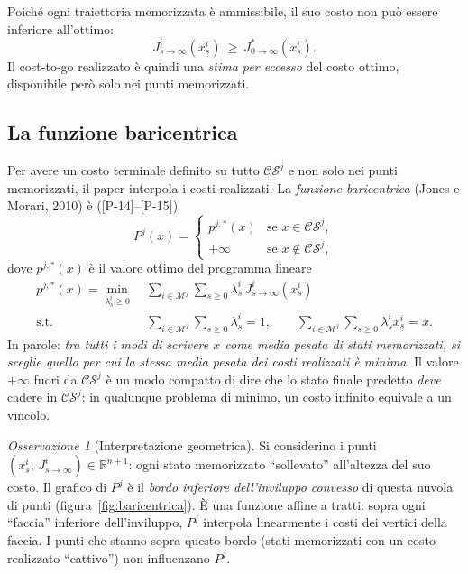 \documentclass[11pt,a4paper]{article}
\theoremstyle{definition}
\theoremstyle{plain}
\theoremstyle{remark}
\newtheorem{osservazione}[definizione]{Osservazione}
\newcommand{\R}{\mathbb{R}}
\newcommand{\CS}{\mathcal{CS}}
\newcommand{\Mc}{\mathcal{M}}
\newcommand{\Jstar}{J^{*}_{0\to\infty}}
\newcommand{\eqp}[1]{\textup{[P-#1]}}   %
\begin{document}
Poiché ogni traiettoria memorizzata è ammissibile, il suo costo non può
essere inferiore all'ottimo:
\begin{equation}\label{eq:costo-maggiore-ottimo}
  J^i_{s\to\infty}(x^i_s)\ \ge\ \Jstar(x^i_s).
\end{equation}
Il cost-to-go realizzato è quindi una \emph{stima per eccesso} del costo
ottimo, disponibile però solo nei punti memorizzati.

\subsection{La funzione baricentrica}

Per avere un costo terminale definito su tutto $\CS^j$ e non solo nei punti
memorizzati, il paper interpola i costi realizzati. La \emph{funzione
baricentrica} (Jones e Morari, 2010) è (\eqp{14}--\eqp{15})
\begin{equation}\label{eq:P}
  P^j(x) =
  \begin{cases}
    p^{j,*}(x) & \text{se } x\in\CS^j,\\
    +\infty    & \text{se } x\notin\CS^j,
  \end{cases}
\end{equation}
dove $p^{j,*}(x)$ è il valore ottimo del programma lineare
\begin{equation}\label{eq:LP}
\begin{aligned}
  p^{j,*}(x) = \min_{\lambda^i_s\ge 0}\ & \sum_{i\in\Mc^j}\sum_{s\ge 0}
      \lambda^i_s\, J^i_{s\to\infty}(x^i_s)\\
  \text{s.t. }\ & \sum_{i\in\Mc^j}\sum_{s\ge 0}\lambda^i_s = 1,\qquad
      \sum_{i\in\Mc^j}\sum_{s\ge 0}\lambda^i_s x^i_s = x.
\end{aligned}
\end{equation}
In parole: \emph{tra tutti i modi di scrivere $x$ come media pesata di stati
memorizzati, si sceglie quello per cui la stessa media pesata dei costi
realizzati è minima}. Il valore $+\infty$ fuori da $\CS^j$ è un modo compatto
di dire che lo stato finale predetto \emph{deve} cadere in $\CS^j$: in
qualunque problema di minimo, un costo infinito equivale a un vincolo.

\begin{osservazione}[Interpretazione geometrica]
Si considerino i punti $(x^i_s,\,J^i_{s\to\infty})\in\R^{n+1}$: ogni stato
memorizzato ``sollevato'' all'altezza del suo costo. Il grafico di $P^j$ è il
\emph{bordo inferiore dell'inviluppo convesso} di questa nuvola di punti
(figura~\ref{fig:baricentrica}). È una funzione affine a tratti: sopra ogni
``faccia'' inferiore dell'inviluppo, $P^j$ interpola linearmente i costi dei
vertici della faccia. I punti che stanno sopra questo bordo (stati
memorizzati con un costo realizzato ``cattivo'') non influenzano $P^j$.
\end{osservazione}
\end{document}
